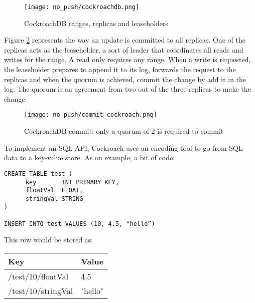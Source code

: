 \begin{figure}[h]
  \vspace{-10pt}
  \centering
  \centerline{\texttt{[image: no\_push/cockroachdb.png]}}
  \vspace{-5pt}
  \caption{CockroachDB ranges, replicas and leaseholders}
  \vspace{-5pt}
  \label{fig:cockroachdb}
\end{figure}

Figure \ref{fig:cockroachdb-commit} represents the way an update is committed to all replicas. One of the replicas acts as the leaseholder, a sort of leader that coordinates all reads and writes for the range. A read only requires any range.
When a write is requested, the leaseholder prepares to append it to its log, forwards the request to the replicas and when the quorum is achieved, commit the change by add it in the log. The quorum is an agreement from two out of the three replicas to make the change.

\begin{figure}[h]
  \vspace{-10pt}
  \centering
  \centerline{\texttt{[image: no\_push/commit-cockroach.png]}}
  \vspace{-5pt}
  \caption{CockroachDB commit: only a quorum of 2 is required to commit }
  \vspace{-5pt}
  \label{fig:cockroachdb-commit}
\end{figure}

To implement an SQL API, Cockroach uses an encoding tool to go from SQL data to a key-value store\cite{CRDB:mapKV}. As an example, a bit of code:
\begin{verbatim}
CREATE TABLE test (
      key       INT PRIMARY KEY,
      floatVal  FLOAT,
      stringVal STRING
)

INSERT INTO test VALUES (10, 4.5, "hello”)
\end{verbatim}

This row would be stored as:

\begin{center}
\begin{tabular}{|l|l|}
\hline
Key & Value\\
\hline
/test/10/floatVal & 4.5\\
/test/10/stringVal & "hello"\\
\hline
\end{tabular}
\end{center}

